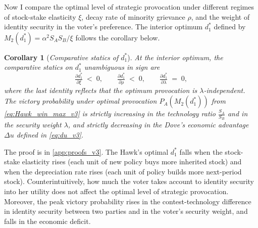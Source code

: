 \documentclass[11pt,twoside]{extarticle}
\newtheorem{corollary}{Corollary}
\begin{document}
Now I compare the optimal level of strategic provocation under different regimes of stock-stake elasticity $\xi$, decay rate of minority grievance $\rho$, and the weight of identity security in the voter's preference. The interior optimum $d_1^*$ defined by $M_2(d_1^*)=\alpha^2 S_A S_B/\xi$ follows the corollary below.

\begin{corollary}[\emph{Comparative statics of $d_1^*$}]\label{cor:cs_optimum_v3}
At the interior optimum, the comparative statics on $d_1^*$ unambiguous in sign are
\begin{equation}\label{eq:cs_d1_v3}
    \tfrac{\partial d_1^*}{\partial \xi}\;<\;0,\qquad \tfrac{\partial d_1^*}{\partial \rho}\;<\;0,\qquad \tfrac{\partial d_1^*}{\partial \lambda}\;=\;0,
\end{equation}
where the last identity reflects that the optimum provocation is $\lambda$-independent. The victory probability under optimal provocation $P_A(M_2(d_1^*))$ from \eqref{eq:Hawk_win_max_v3} is strictly increasing in the technology ratio $\frac{S_A}{S_B}$ and in the security weight $\lambda$, and strictly decreasing in the Dove's economic advantage $\Delta u$ defined in \eqref{eq:du_v3}.
\end{corollary}

The proof is in \autoref{app:proofs_v3}. The Hawk's optimal $d_1^*$ falls when the stock-stake elasticity rises (each unit of new policy buys more inherited stock) and when the depreciation rate rises (each unit of policy builds more next-period stock). Counterintuitively, how much the voter takes account to identity security into her utility does not affect the optimal level of strategic provocation. Moreover, the peak victory probability rises in the contest-technology difference in identity security between two parties and in the voter's security weight, and falls in the economic deficit.

\end{document}
